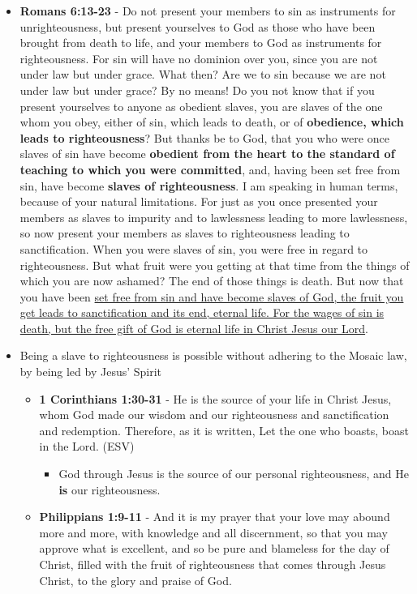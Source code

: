\documentclass[11pt]{article}
\begin{document}
\begin{itemize}
\begin{itemize}
\item \textbf{Romans 6:13-23} - Do not present your members to sin as instruments for unrighteousness, but present yourselves to God as those who have been brought from death to life, and your members to God as instruments for righteousness.  For sin will have no dominion over you, since you are not under law but under grace.  What then? Are we to sin because we are not under law but under grace? By no means!  Do you not know that if you present yourselves to anyone as obedient slaves, you are slaves of the one whom you obey, either of sin, which leads to death, or of \textbf{obedience, which leads to righteousness}?  But thanks be to God, that you who were once slaves of sin have become \textbf{obedient from the heart to the standard of teaching to which you were committed}, and, having been set free from sin, have become \textbf{slaves of righteousness}.  I am speaking in human terms, because of your natural limitations. For just as you once presented your members as slaves to impurity and to lawlessness leading to more lawlessness, so now present your members as slaves to righteousness leading to sanctification.  When you were slaves of sin, you were free in regard to righteousness.  But what fruit were you getting at that time from the things of which you are now ashamed? The end of those things is death.  But now that you have been \uline{set free from sin and have become slaves of God, the fruit you get leads to sanctification and its end, eternal life.  For the wages of sin is death, but the free gift of God is eternal life in Christ Jesus our Lord}.
\item Being a slave to righteousness is possible without adhering to the Mosaic law, by being led by Jesus' Spirit
\begin{itemize}
\item \textbf{1 Corinthians 1:30-31} -  He is the source of your life in Christ Jesus, whom God made our wisdom and our righteousness and sanctification and redemption.  Therefore, as it is written, Let the one who boasts, boast in the Lord.  (ESV)
\begin{itemize}
\item God through Jesus is the source of our personal righteousness, and He \textbf{is} our righteousness.
\end{itemize}
\item \textbf{Philippians 1:9-11} - And it is my prayer that your love may abound more and more, with knowledge and all discernment, so that you may approve what is excellent, and so be pure and blameless for the day of Christ, filled with the fruit of righteousness that comes through Jesus Christ, to the glory and praise of God.

\end{itemize}
\end{itemize}
\end{itemize}
\end{document}
